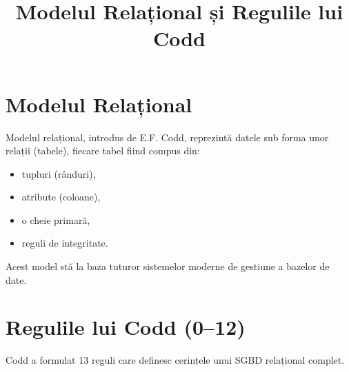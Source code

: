 \documentclass[12pt,a4paper]{article}
\title{Modelul Relațional și Regulile lui Codd}
\author{}
\date{}
\begin{document}
\maketitle

\section{Modelul Relațional}
Modelul relațional, introdus de E.F. Codd, reprezintă datele sub forma unor relații
(tabele), fiecare tabel fiind compus din:
\begin{itemize}[noitemsep]
    \item tupluri (rânduri),
    \item atribute (coloane),
    \item o cheie primară,
    \item reguli de integritate.
\end{itemize}

Acest model stă la baza tuturor sistemelor moderne de gestiune a bazelor de date.

\section{Regulile lui Codd (0--12)}
Codd a formulat 13 reguli care definesc cerințele unui SGBD relațional complet.
\end{document}
